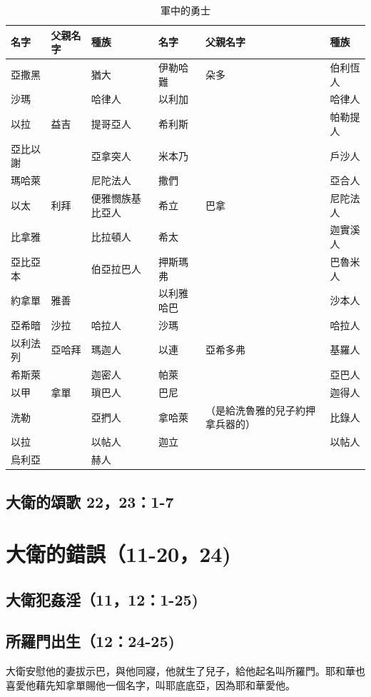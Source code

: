 \begin{table}[!hbp]
\centering
\begin{tabular}{|p{2cm}|p{2cm}|p{2cm}||p{2cm}|p{2cm}|p{2cm}|}\hline\hline
名字    &父親名字 & 種族 & 名字   &父親名字 & 種族   \\\hline\hline
亞撒黑 &  &  猶大 &伊勒哈難&朵多 &伯利恆人\\\hline  
沙瑪&    & 哈律人 &  以利加&  &哈律人 \\\hline
以拉&益吉  & 提哥亞人 &  希利斯& &帕勒提人\\\hline
 亞比以謝& &亞拿突人&米本乃 & & 戶沙人 \\\hline
 瑪哈萊 & & 尼陀法人 & 撒們&  &亞合人    \\\hline
 以太 &利拜 &  便雅憫族基比亞人  &  希立&巴拿 &尼陀法人    \\\hline
  比拿雅 &  &  比拉頓人  &  希太&  &迦實溪人    \\\hline
 亞比亞本&  & 伯亞拉巴人  &  押斯瑪弗&  &巴魯米人    \\\hline
 約拿單&雅善 &  &  以利雅哈巴& &沙本人 \\\hline
亞希暗&沙拉 & 哈拉人& 沙瑪&  &哈拉人 \\\hline
 以利法列 &亞哈拜 &   瑪迦人&  以連& 亞希多弗 & 基羅人\\\hline
希斯萊 & &    迦密人 &   帕萊& & 亞巴人\\\hline
以甲 &拿單 &   瑣巴人 &  巴尼& & 迦得人\\\hline
洗勒& &亞捫人& 拿哈萊&（是給洗魯雅的兒子約押拿兵器的） &比錄人 \\\hline
以拉&  &以帖人& 迦立&  &以帖人\\\hline
烏利亞&  & 赫人&  &  &  \\\hline
\end{tabular}
\caption{軍中的勇士}
\end{table}

\subsection{大衛的頌歌 22，23：1-7}


\newpage
\section{大衛的錯誤（11-20，24)}
\subsection{大衛犯姦淫（11，12：1-25)}
\subsection{所羅門出生（12：24-25)}
大衛安慰他的妻拔示巴，與他同寢，他就生了兒子，給他起名叫所羅門。耶和華也喜愛他藉先知拿單賜他一個名字，叫耶底底亞，因為耶和華愛他。

